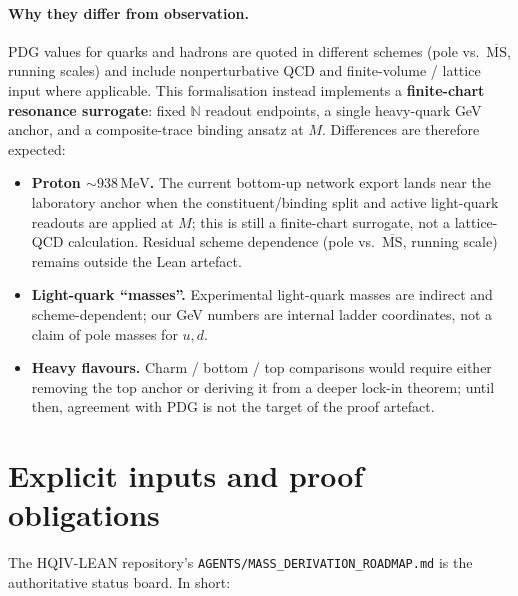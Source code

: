 \documentclass[11pt]{article}
\begin{document}
\paragraph{Why they differ from observation.}
PDG values \cite{pdg2024} for quarks and hadrons are quoted in
different schemes (pole vs.\ $\overline{\mathrm{MS}}$, running
scales) and include nonperturbative QCD and finite-volume /
lattice input where applicable. This formalisation instead
implements a \textbf{finite-chart resonance surrogate}: fixed
$\mathbb{N}$ readout endpoints, a single heavy-quark GeV
anchor, and a composite-trace binding ansatz at $M$. Differences
are therefore expected:
\begin{itemize}[leftmargin=2em]
  \item \textbf{Proton $\sim 938\,\mathrm{MeV}$.} The current
    bottom-up network export lands near the laboratory anchor
    when the constituent/binding split and active
    light-quark readouts are applied at $M$; this is still a
    finite-chart surrogate, not a lattice-QCD calculation.
    Residual scheme dependence (pole vs.\ $\overline{\mathrm{MS}}$,
    running scale) remains outside the Lean artefact.
  \item \textbf{Light-quark ``masses''.} Experimental
    light-quark masses are indirect and scheme-dependent; our
    GeV numbers are internal ladder coordinates, not a claim
    of pole masses for $u,d$.
  \item \textbf{Heavy flavours.} Charm / bottom / top
    comparisons would require either removing the top anchor
    or deriving it from a deeper lock-in theorem; until then,
    agreement with PDG \cite{pdg2024} is not the target of
    the proof artefact.
\end{itemize}

\section{Explicit inputs and proof obligations}
\label{sec:roadmap}

The HQIV-LEAN repository's
\texttt{AGENTS/MASS\_DERIVATION\_ROADMAP.md} is the
authoritative status board. In short:
\end{document}
